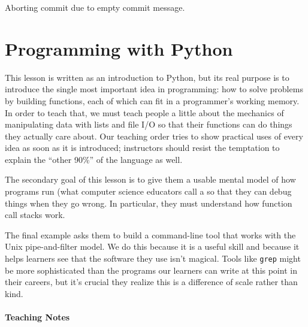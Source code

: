 \documentclass{book}
\begin{document}
\begin{VerbOut}
Aborting commit due to empty commit message.
\end{VerbOut}

\section{Programming with Python}

This lesson is written as an introduction to Python, but its real
purpose is to introduce the single most important idea in programming:
how to solve problems by building functions, each of which can fit in a
programmer's working memory. In order to teach that, we must teach
people a little about the mechanics of manipulating data with lists and
file I/O so that their functions can do things they actually care about.
Our teaching order tries to show practical uses of every idea as soon as
it is introduced; instructors should resist the temptation to explain
the ``other 90\%'' of the language as well.

The secondary goal of this lesson is to give them a usable mental model
of how programs run (what computer science educators call a
 so that they can debug
things when they go wrong. In particular, they must understand how
function call stacks work.

The final example asks them to build a command-line tool that works with
the Unix pipe-and-filter model. We do this because it is a useful skill
and because it helps learners see that the software they use isn't
magical. Tools like \texttt{grep} might be more sophisticated than the
programs our learners can write at this point in their careers, but it's
crucial they realize this is a difference of scale rather than kind.

\mbox{}\paragraph{Teaching Notes}
\end{document}
